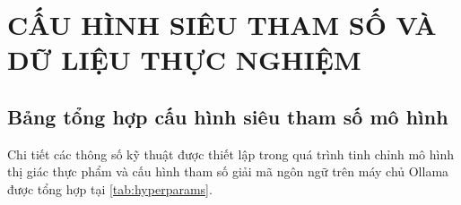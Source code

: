 
\chapter{CẤU HÌNH SIÊU THAM SỐ VÀ DỮ LIỆU THỰC NGHIỆM}
\label{app:hyperparams}

\section{Bảng tổng hợp cấu hình siêu tham số mô hình}

Chi tiết các thông số kỹ thuật được thiết lập trong quá trình tinh chỉnh mô hình thị giác thực phẩm và cấu hình tham số giải mã ngôn ngữ trên máy chủ Ollama được tổng hợp tại \cref{tab:hyperparams}.

